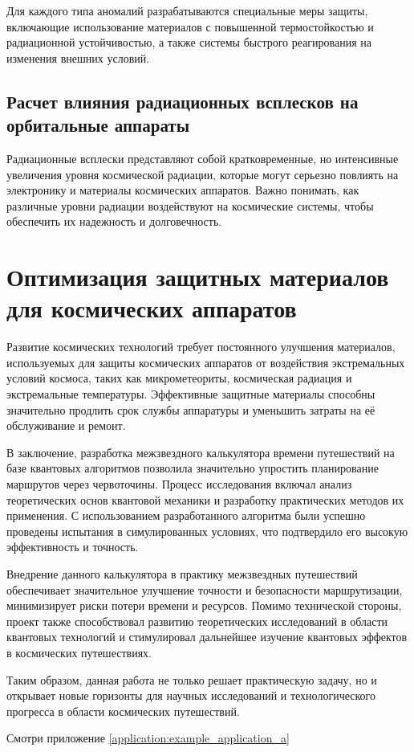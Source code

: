 \documentclass[]{../vvsu}
\begin{document}
Для каждого типа аномалий разрабатываются специальные меры защиты, включающие использование материалов с повышенной термостойкостью и радиационной устойчивостью, а также системы быстрого реагирования на изменения внешних условий.

\subsection{Расчет влияния радиационных всплесков на орбитальные аппараты}

Радиационные всплески представляют собой кратковременные, но интенсивные увеличения уровня космической радиации, которые могут серьезно повлиять на электронику и материалы космических аппаратов. Важно понимать, как различные уровни радиации воздействуют на космические системы, чтобы обеспечить их надежность и долговечность.

\pagebreak
\section{Оптимизация защитных материалов для космических аппаратов}

Развитие космических технологий требует постоянного улучшения материалов, используемых для защиты космических аппаратов от воздействия экстремальных условий космоса, таких как микрометеориты, космическая радиация и экстремальные температуры. Эффективные защитные материалы способны значительно продлить срок службы аппаратуры и уменьшить затраты на её обслуживание и ремонт.

\clearpage
\begin{conclusion}
  В заключение, разработка межзвездного калькулятора времени путешествий на базе квантовых алгоритмов позволила значительно упростить планирование маршрутов через червоточины. Процесс исследования включал анализ теоретических основ квантовой механики и разработку практических методов их применения. С использованием разработанного алгоритма были успешно проведены испытания в симулированных условиях, что подтвердило его высокую эффективность и точность.

  Внедрение данного калькулятора в практику межзвездных путешествий обеспечивает значительное улучшение точности и безопасности маршрутизации, минимизирует риски потери времени и ресурсов. Помимо технической стороны, проект также способствовал развитию теоретических исследований в области квантовых технологий и стимулировал дальнейшее изучение квантовых эффектов в космических путешествиях.

  Таким образом, данная работа не только решает практическую задачу, но и открывает новые горизонты для научных исследований и технологического прогресса в области космических путешествий.

  Смотри приложение \ref{application:example_application_a}
\end{conclusion}
\end{document}
